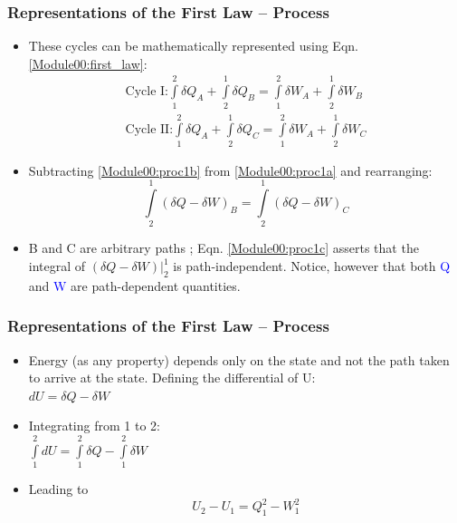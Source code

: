 \documentclass[10pt,compress,handout,ignorenonframetext]{beamer}
\begin{document}
\begin{frame}
 \frametitle{Representations of the First Law -- Process}
   \begin{itemize}
    \item <1-> These cycles can be mathematically represented using Eqn. \ref{Module00:first_law}:
   \begin{eqnarray}
    \text{Cycle I:}  \int\limits_{1}^{2}\delta Q_{A} + \int\limits_{2}^{1}\delta Q_{B} = \int\limits_{1}^{2}\delta W_{A} + \int\limits_{2}^{1}\delta W_{B}  \label{Module00:proc1a}\\
    \text{Cycle II:} \int\limits_{1}^{2}\delta Q_{A} + \int\limits_{2}^{1}\delta Q_{C} = \int\limits_{1}^{2}\delta W_{A} + \int\limits_{2}^{1}\delta W_{C}  \label{Module00:proc1b}
   \end{eqnarray}
   \item <2-> Subtracting \ref{Module00:proc1b} from \ref{Module00:proc1a} and rearranging:
   \begin{equation}
    \int\limits_{2}^{1}\left(\delta Q- \delta W\right)_{B} = \int\limits_{2}^{1}\left(\delta Q- \delta W\right)_{C}\label{Module00:proc1c}
   \end{equation}
   \item <3-> B and C are arbitrary paths ; Eqn. \ref{Module00:proc1c} asserts that the integral of $\left(\delta Q -\delta W\right)\left.\right|_{2}^{1}$ is path-independent. Notice, however that both \textcolor{blue}{Q} and \textcolor{blue}{W} are path-dependent quantities. 
    \end{itemize}
\end{frame}



\begin{frame}
 \frametitle{Representations of the First Law -- Process}

  \begin{itemize}
   \item <1-> Energy (as any property) depends only on the state and not the path taken to arrive at the state. Defining the differential of U:\\
    $dU =\delta Q - \delta W$\\ 
   
   \item <2-> Integrating from 1 to 2:\\
    $\displaystyle\int\limits_{1}^{2}dU =\displaystyle\int\limits_{1}^{2}\delta Q - \displaystyle\int\limits_{1}^{2}\delta W$\\ 

   \item <3-> Leading to
   \begin{equation}
    U_{2} - U_{1} = Q_{1}^{2}- W_{1}^{2} \label{Module00:proc1a}
   \end{equation}

  \end{itemize}
\normalsize
\end{frame}
\end{document}
